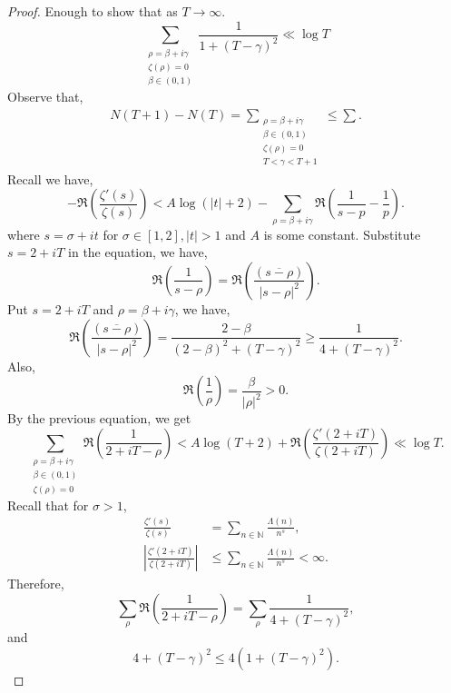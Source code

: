 \documentclass{article}
\newcommand{\N}[0]{\mathbb{N}}
\begin{document}
\begin{proof}
  Enough to show that as $T\to \infty$.
  \begin{equation*}
    \sum_{\substack{\rho=\beta+i\gamma\\\zeta(\rho) = 0\\\beta\in(0,1)}}{\frac 1 {1+(T-\gamma)^2}}\ll \log T
  \end{equation*}
  Observe that,
  \begin{align*}
    N(T+1)-N(T) = \sum_{\substack{\rho=\beta+i\gamma\\\beta\in(0,1)\\\zeta(\rho) = 0\\ T<\gamma<T+1}}\leq\sum.
  \end{align*}
  Recall %
  we have,
  \begin{equation*}
    -\Re\left({\frac {\zeta'(s)} {\zeta(s)}}\right)<A\log(\vert t\vert+2)-\sum_{\rho=\beta+i\gamma}\Re\left({\frac 1 {s-p}}-{\frac 1 p}\right).
  \end{equation*}
  where $s=\sigma+it$ for $\sigma\in[1,2],\vert t\vert>1$ and $A$ is some constant. Substitute $s=2+iT$ in the equation, we have,
  \begin{equation*}
    \Re\left({\frac 1 {s-\rho}}\right)=\Re\left({\frac {(\overline{s-\rho})} {\vert s-\rho\vert^2}}\right).
  \end{equation*}
  Put $s=2+iT$ and $\rho=\beta+i\gamma$, we have,
  \begin{equation*}
    \Re\left({\frac {(\overline{s-\rho})} {\vert s-\rho\vert^2}}\right)={\frac {2-\beta}{(2-\beta)^2+(T-\gamma)^2}}\geq{\frac 1 {4+(T-\gamma)^2}}.
  \end{equation*}
  Also,
  \begin{equation*}
    \Re\left({\frac 1 \rho}\right) = {\frac {\beta} {\vert\rho\vert^2}}>0.
  \end{equation*}
  By the previous equation, we get%
  \begin{equation*}
    \sum_{\substack{\rho=\beta+i\gamma\\ \beta\in(0,1)\\\zeta(\rho)=0}}\Re\left({\frac 1 {2+iT-\rho}}\right)< A\log(T+2)+\Re\left({\frac {\zeta'(2+iT)}{\zeta(2+iT)}}\right)\ll \log T.
  \end{equation*}
  Recall that for $\sigma>1$,
  \begin{align*}
    {\frac {\zeta'(s)}{\zeta(s)}}&=\sum_{n\in\N}{\frac {\Lambda(n)} {n^s}},\\
    \left\vert{\frac {\zeta'(2+iT)} {\zeta(2+iT)}}\right\vert &\leq\sum_{n\in \N}{\frac {\Lambda(n)} {n^s}}<\infty.
  \end{align*}
  Therefore,
  \begin{equation*}
    \sum_{\rho}\Re\left({\frac 1 {2+iT-\rho}}\right) = \sum_{\rho}{\frac 1 {4+(T-\gamma)^2}},
  \end{equation*}
  and 
  \begin{equation*}
    4+(T-\gamma)^2\leq 4(1+(T-\gamma)^2).
  \end{equation*}
\end{proof}
\end{document}
